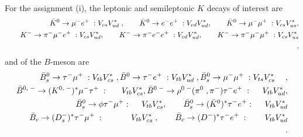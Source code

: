 \documentclass{ws-ijmpa}
\begin{document}
For the assignment (i), the leptonic and semileptonic $K$ decays of interest are
\begin{eqnarray}
\bar{K}^{0} \to \mu^{-}e^{+}\; : V_{cs}V^{*}_{ud}\; , \quad\quad \bar{K}^{0} \to e^{-}e^{+}\; : V_{cd}V^{*}_{ud} , \quad\quad \bar{K}^{0} \to \mu^{-}\mu^{+}\; : V_{cs}V^{*}_{us} ,\notag\\
\quad\quad K^{-} \to \pi^{-}\mu^{-}e^{+}\; : V_{cs}V^{*}_{ud} , \quad\quad K^{-} \to \pi^{-}e^{-}e^{+}\; : V_{cd}V^{*}_{ud} , \quad\quad K^{-} \to \pi^{-}\mu^{-}\mu^{+}\; : V_{cs}V^{*}_{us} \notag\\
\label{Kd1-1},
\end{eqnarray}
and of the $B$-meson are
\begin{eqnarray}
\bar{B}_{s}^{0} \to \tau^{-}\mu^{+}\; : V_{tb}V^{*}_{cs}\; , \bar{B}^{0} \to \tau^{-}e^{+}\; : V_{tb}V^{*}_{ud}\; ,  \bar{B}_{s}^{0} \to \mu^{-}\mu^{+}\; : V_{ts}V^{*}_{cs} \quad \;, \notag\\
\bar{B}^{0,\; -}  \to  (K^{0,\; -})^{*}\mu^{-}\tau^{+} \; : \quad \ \ V_{tb}V^{*}_{cs} ,
\bar{B}^{0\; -} \to  \rho^{0\; -}(\pi^{0}\; , \pi^{-} )\tau^{-}e^{+} \; : \quad \ V_{tb}V^{*}_{ud} ,   \notag \\
\quad\quad \bar{B}_{s}^{0} \to \phi \tau^{-}\mu^{+} : \quad \ V_{tb}V^{*}_{cs} , \quad \quad \bar{B}_{s}^{0} \to (\bar{K}^{0})^{*} \tau^{-}e^{+} : \quad \ V_{tb}V^{*}_{ud}\notag \\
\bar{B}_{c}  \to   (D_{s}^{-})^{*}\tau^{-}\mu^{+} \; : \quad\quad\quad \ V_{tb}V^{*}_{cs} \; , \quad\quad \bar{B}_{c}  \to   (D^{-})^{*}\tau^{-}e^{+} \; : \quad\quad V_{tb}V^{*}_{ud} \notag\\
\label{Bd1-1}.
\end{eqnarray}
\end{document}
